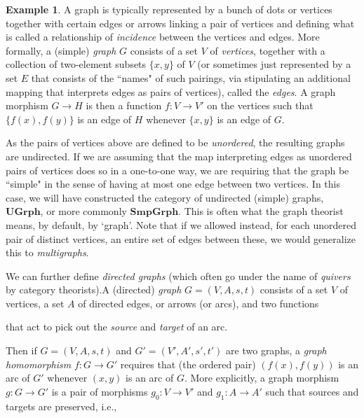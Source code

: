 \documentclass[11pt]{book}
\theoremstyle{definition}
\newtheorem{example}{Example}[section]
\theoremstyle{definition}
\theoremstyle{definition}
\theoremstyle{theorem}
\theoremstyle{definition}
\begin{document}
\begin{example}
	A graph  is typically represented by a bunch of dots or vertices together with certain edges or arrows linking a pair of vertices and defining what is called a relationship of \textit{incidence} between the vertices and edges. More formally, a (simple) \textit{graph} $G$ consists of a set $V$ of \textit{vertices}, together with a collection of two-element subsets $\{x,y\}$ of $V$ (or sometimes just represented by a set $E$ that consists of the ``names" of such pairings, via stipulating an additional mapping that interprets edges as pairs of vertices), called the \textit{edges}. A graph morphism $G \rightarrow H$ is then a function $f: V \rightarrow V'$ on the vertices such that $\{f(x), f(y)\}$ is an edge of $H$ whenever $\{x,y\}$ is an edge of $G$.\par
	As the pairs of vertices above are defined to be \textit{unordered}, the resulting graphs are undirected. If we are assuming that the map interpreting edges as unordered pairs of vertices does so in a one-to-one way, we are requiring that the graph be ``simple" in the sense of having at most one edge between two vertices. In this case, we will have constructed the category of undirected (simple) graphs, $\textbf{UGrph}$, or more commonly $\textbf{SmpGrph}$. This is often what the graph theorist means, by default, by `graph'. Note that if we allowed instead, for each unordered pair of distinct vertices, an entire set of edges between these, we would generalize this to \textit{multigraphs}.\par   
	We can further define \textit{directed graphs} (which often go under the name of \textit{quivers} by category theorists).\label{example: graph} A (directed) \textit{graph} $G = (V, A, s, t)$ consists of a set $V$ of vertices, a set $A$ of directed edges, or arrows (or arcs), and two functions 
		\begin{center} 
	\end{center} 
that act to pick out the \textit{source} and \textit{target} of an arc. \par 
Then if $G = (V, A, s,t)$ and $G' = (V', A', s', t')$ are two graphs, a \textit{graph homomorphism} $f: G \rightarrow G'$ requires that (the ordered pair) $(f(x), f(y))$ is an arc of $G'$ whenever $(x,y)$ is an arc of $G$. More explicitly, a graph morphism $g: G \rightarrow G'$ is a pair of morphisms $g_0: V \rightarrow V'$ and $g_1: A \rightarrow A'$ such that sources and targets are preserved, i.e., 

\end{example}
\end{document}
